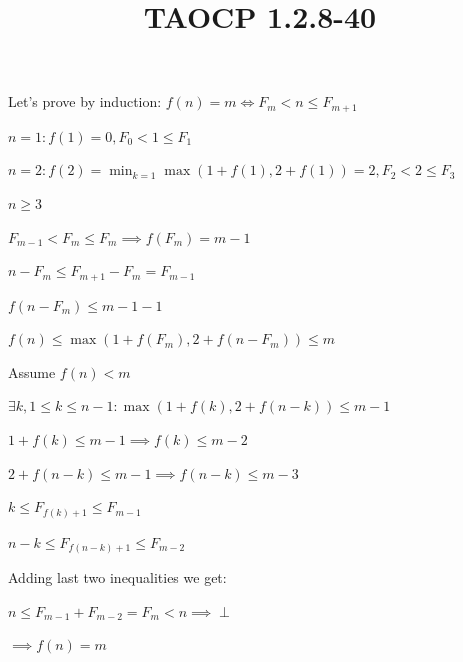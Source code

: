 \documentclass{article}
\title{TAOCP 1.2.8\mbox{-}40}
\begin{document}
\maketitle

Let's prove by induction: \( f(n) = m \iff F_{m} < n \leq F_{m+1} \)

\( n = 1: f(1) = 0, F_0 < 1 \leq F_1 \)

\( n = 2: f(2) = \min_{k=1} \max(1+f(1),2+f(1)) = 2, F_2 < 2 \leq F_3 \)

\( n \geq 3 \)

\( F_{m-1} < F_m \leq F_m \implies f(F_m) = m - 1 \)

\( n - F_m \leq F_{m+1} - F_m = F_{m-1} \)

\( f(n - F_m) \leq m - 1 - 1\)

\( f(n) \leq \max(1 + f(F_m), 2 + f(n - F_m)) \leq m \)

Assume \( f(n) < m \)

\( \exists k, 1 \leq k \leq n - 1: \max(1 + f(k), 2 + f(n - k)) \leq m - 1 \)

\( 1 + f(k) \leq m - 1 \implies f(k) \leq m - 2 \)

\( 2 + f(n - k) \leq m - 1 \implies f(n - k) \leq m - 3 \)

\( k \leq F_{f(k)+1} \leq F_{m-1} \)

\( n - k \leq F_{f(n-k)+1} \leq F_{m-2} \)

Adding last two inequalities we get:

\( n \leq F_{m-1} + F_{m-2} = F_{m} < n \implies \perp \)

\( \implies f(n) = m \)
\end{document}
